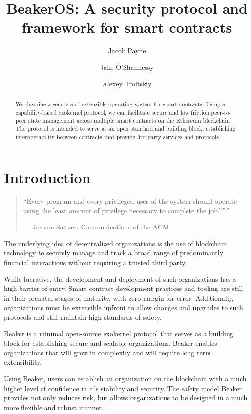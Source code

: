 \documentclass[english,a4paper]{article}
\title{BeakerOS: A security protocol and framework for smart
contracts}\label{beakeros-a-security-protocol-and-framework-for-smart-contracts}
\author{Jacob Payne \and Jake O'Shannessy \and Alexey Troitskiy}
\begin{document}
\maketitle

\begin{abstract}\label{abstract}

We describe a secure and extensible operating system for smart
contracts. Using a capability-based exokernel protocol, we can
facilitate secure and low friction peer-to-peer state management across
multiple smart contracts on the Ethereum blockchain. The protocol is
intended to serve as an open standard and building block, establishing
interoperability between contracts that provide 3rd party services and
protocols.

\end{abstract}

\newpage
\tableofcontents
\newpage

\section{Introduction}\label{introduction}

\begin{quote}
``Every program and every privileged user of the system should operate
using the least amount of privilege necessary to complete the job.''''''

--- Jerome Saltzer, Communications of the ACM
\end{quote}

The underlying idea of decentralized organizations is the use of
blockchain technology to securely manage and track a broad range of
predominantly financial interactions without requiring a trusted third
party.

While lucrative, the development and deployment of such organizations
has a high barrier of entry. Smart contract development practices and
tooling are still in their prenatal stages of maturity, with zero margin
for error. Additionally, organizations must be extensible upfront to
allow changes and upgrades to such protocols and still maintain high
standards of safety.

Beaker is a minimal open-source exokernel protocol that serves as a
building block for establishing secure and scalable organizations.
Beaker enables organizations that will grow in complexity and will
require long term extensibility.

Using Beaker, users can establish an organization on the blockchain with
a much higher level of confidence in it's stability and security. The
safety model Beaker provides not only reduces risk, but allows
organizations to be designed in a much more flexible and robust manner.
\end{document}
